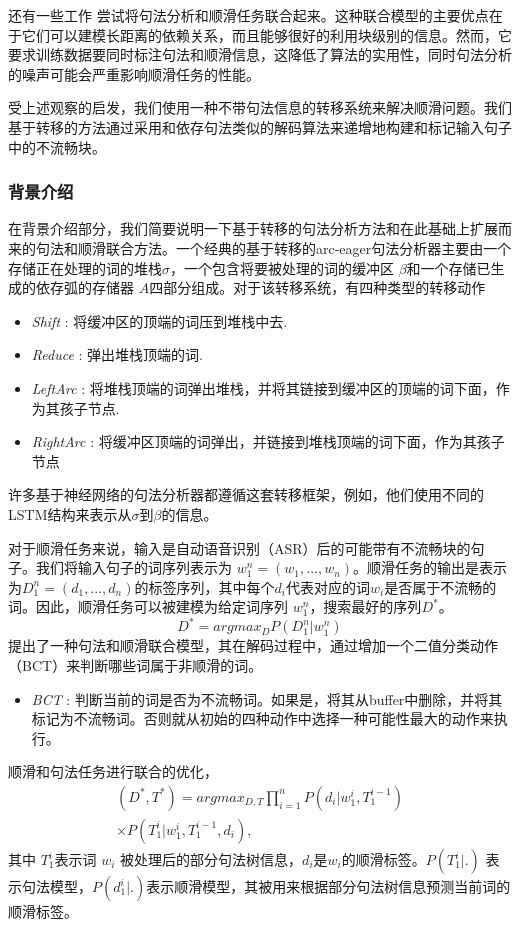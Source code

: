 还有一些工作   尝试将句法分析和顺滑任务联合起来。这种联合模型的主要优点在于它们可以建模长距离的依赖关系，而且能够很好的利用块级别的信息。然而，它要求训练数据要同时标注句法和顺滑信息，这降低了算法的实用性，同时句法分析的噪声可能会严重影响顺滑任务的性能。

受上述观察的启发，我们使用一种不带句法信息的转移系统来解决顺滑问题。我们基于转移的方法通过采用和依存句法类似的解码算法来递增地构建和标记输入句子中的不流畅块。
\subsubsection{背景介绍}
	在背景介绍部分，我们简要说明一下基于转移的句法分析方法和在此基础上扩展而来的句法和顺滑联合方法。一个经典的基于转移的arc-eager句法分析器主要由一个存储正在处理的词的堆栈$\sigma$，一个包含将要被处理的词的缓冲区 $\beta$和一个存储已生成的依存弧的存储器 $A$四部分组成。对于该转移系统，有四种类型的转移动作
\begin{itemize}
	\item \textit{Shift} : 将缓冲区的顶端的词压到堆栈中去.
	\item \textit{Reduce} : 弹出堆栈顶端的词.
	\item \textit{LeftArc} : 将堆栈顶端的词弹出堆栈，并将其链接到缓冲区的顶端的词下面，作为其孩子节点.
	\item \textit{RightArc} : 将缓冲区顶端的词弹出，并链接到堆栈顶端的词下面，作为其孩子节点
\end{itemize}
许多基于神经网络的句法分析器都遵循这套转移框架，例如，他们使用不同的LSTM结构来表示从$\sigma$到$\beta$的信息。

对于顺滑任务来说，输入是自动语音识别（ASR）后的可能带有不流畅块的句子。我们将输入句子的词序列表示为 $w_{1}^{n} = (w_1, . . . , w_n )$。顺滑任务的输出是表示为$D_{1}^{n} = (d_1, . . . , d_n )$的标签序列，其中每个$d_i$代表对应的词$w_i$是否属于不流畅的词。因此，顺滑任务可以被建模为给定词序列 $w_{1}^{n}$，搜索最好的序列$D^*$。
\begin{equation}
D^* = argmax_{D}P(D_1^n|w_1^n)\nonumber
\end{equation}
 提出了一种句法和顺滑联合模型，其在解码过程中，通过增加一个二值分类动作（BCT）来判断哪些词属于非顺滑的词。
\begin{itemize}
	\item \textit{BCT} : 判断当前的词是否为不流畅词。如果是，将其从buffer中删除，并将其标记为不流畅词。否则就从初始的四种动作中选择一种可能性最大的动作来执行。
\end{itemize}
顺滑和句法任务进行联合的优化，
\begin{equation}
\begin{split}
(D^*, T^*) = argmax_{D,T}\prod_{i=1}^{n}P(d_i|w_1^i,T_1^{i-1}) \\ 
\times P(T_1^i|w_1^i,T_1^{i-1},d_i), \nonumber
\end{split}
\end{equation}
其中 $T_1^i$表示词 $w_i$ 被处理后的部分句法树信息，$d_i$是$w_i$的顺滑标签。$P(T_1^i|.)$ 表示句法模型，$P(d_1^i|.)$表示顺滑模型，其被用来根据部分句法树信息预测当前词的顺滑标签。

